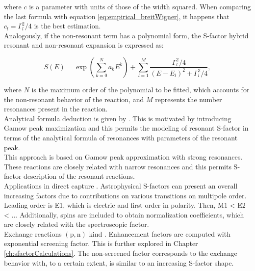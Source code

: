 \documentclass[openany]{book}
\begin{document}
where $c$ is a parameter with units of those of the width squared. When comparing the last formula with equation \ref{eq:empirical_breitWigner}, it happens that $c_l = \Gamma^2_l/4$ is the best estimation. \\

Analogously, if the non-resonant term has a polynomial form, the S-factor hybrid resonant and non-resonant expansion is expressed as:

\begin{equation}  \label{eq:empirical_hybridExponential}
	S(E) =  \exp { \left( \sum _{k = 0}^{N} {a_kE^k} \right) } + \sum_{l = 1}^{M} {\frac{\Gamma_l^2/4}{(E - E_l)^2 + \Gamma_l^2/4}},
\end{equation}

where $N$ is the maximum order of the polynomial to be fitted, which accounts for the non-resonant behavior of the reaction, and $M$ represents the number resonances present in the reaction.  \\

Analytical formula deduction is given by \cite{kimura_bonasera_2013}. This is motivated by introducing Gamow peak maximization and this permits the modeling of resonant S-factor in terms of the analytical formula of resonances with parameters of the resonant peak. \\

This approach is based on Gamow peak approximation with strong resonances. These reactions are closely related with narrow resonances and this permits S-factor description of the resonant reactions.   \\

Applications in direct capture \cite{jennings_karataglidis_shoppa_1998}. Astrophysical S-factors can present an overall increasing factors due to contributions on various transitions on multipole order.  Leading order is E1, which is electric and first order in polarity. Then, M1 < E2 < ...  Additionally, spins are included to obtain normalization coefficients, which are closely related with the spectroscopic factor. \\

 Exchange reactions $\mathrm{(p, n)}$ kind \cite{hussein_abdullah_2020}. Enhancement factors are computed with exponential screening factor. This is further explored in Chapter \ref{ch:sfactorCalculations}. The non-screened factor corresponds to the exchange behavior with, to a certain extent, is similar to an increasing S-factor shape. \\
\end{document}
